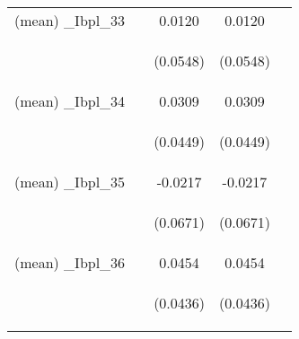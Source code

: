 \documentclass[]{article}
\begin{document}
\begin{center}
\begin{tabular}{lcccc}
(mean) \_Ibpl\_33 &  & 0.0120 & 0.0120 &  \\
\vspace{4pt} & \begin{footnotesize}\end{footnotesize} & \begin{footnotesize}(0.0548)\end{footnotesize} & \begin{footnotesize}(0.0548)\end{footnotesize} & \begin{footnotesize}\end{footnotesize} \\
(mean) \_Ibpl\_34 &  & 0.0309 & 0.0309 &  \\
\vspace{4pt} & \begin{footnotesize}\end{footnotesize} & \begin{footnotesize}(0.0449)\end{footnotesize} & \begin{footnotesize}(0.0449)\end{footnotesize} & \begin{footnotesize}\end{footnotesize} \\
(mean) \_Ibpl\_35 &  & -0.0217 & -0.0217 &  \\
\vspace{4pt} & \begin{footnotesize}\end{footnotesize} & \begin{footnotesize}(0.0671)\end{footnotesize} & \begin{footnotesize}(0.0671)\end{footnotesize} & \begin{footnotesize}\end{footnotesize} \\
(mean) \_Ibpl\_36 &  & 0.0454 & 0.0454 &  \\
\vspace{4pt} & \begin{footnotesize}\end{footnotesize} & \begin{footnotesize}(0.0436)\end{footnotesize} & \begin{footnotesize}(0.0436)\end{footnotesize} & \begin{footnotesize}\end{footnotesize} \\

\end{tabular}
\end{center}
\end{document}
